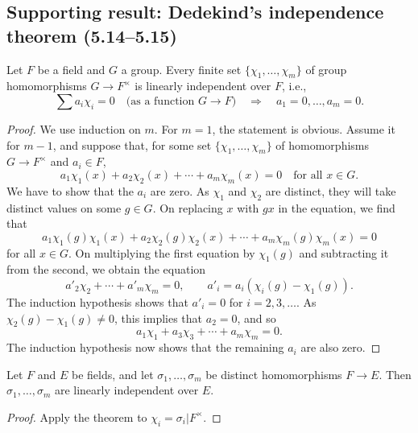 
\subsection*{Supporting result: Dedekind's independence theorem (5.14--5.15)}
\begin{theorem}[Dedekind, 5.14]
Let $F$ be a field and $G$ a group. Every finite set $\{\chi_1,\ldots,\chi_m\}$ of group homomorphisms $G\to F^\times$ is linearly independent over $F$, i.e.,
\[
\sum a_i\chi_i=0\quad\text{(as a function $G\to F$)}
\quad\Longrightarrow\quad a_1=0,\ldots,a_m=0.
\]
\end{theorem}
\begin{proof}
We use induction on $m$. For $m=1$, the statement is obvious. Assume it for $m-1$, and suppose that, for some set $\{\chi_1,\ldots,\chi_m\}$ of homomorphisms $G\to F^\times$ and $a_i\in F$,
\[
a_1\chi_1(x)+a_2\chi_2(x)+\cdots+a_m\chi_m(x)=0\quad\text{for all }x\in G.
\]
We have to show that the $a_i$ are zero. As $\chi_1$ and $\chi_2$ are distinct, they will take distinct values on some $g\in G$. On replacing $x$ with $gx$ in the equation, we find that
\[
a_1\chi_1(g)\chi_1(x)+a_2\chi_2(g)\chi_2(x)+\cdots+a_m\chi_m(g)\chi_m(x)=0
\]
for all $x\in G$. On multiplying the first equation by $\chi_1(g)$ and subtracting it from the second, we obtain the equation
\[
a'_2\chi_2+\cdots+a'_m\chi_m=0,\qquad a'_i=a_i(\chi_i(g)-\chi_1(g)).
\]
The induction hypothesis shows that $a'_i=0$ for $i=2,3,\ldots$. As $\chi_2(g)-\chi_1(g)\ne0$, this implies that $a_2=0$, and so
\[
a_1\chi_1+a_3\chi_3+\cdots+a_m\chi_m=0.
\]
The induction hypothesis now shows that the remaining $a_i$ are also zero.
\end{proof}
\begin{corollary}[5.15]
Let $F$ and $E$ be fields, and let $\sigma_1,\ldots,\sigma_m$ be distinct homomorphisms $F\to E$. Then $\sigma_1,\ldots,\sigma_m$ are linearly independent over $E$.
\end{corollary}
\begin{proof}
Apply the theorem to $\chi_i=\sigma_i|F^\times$.
\end{proof}

